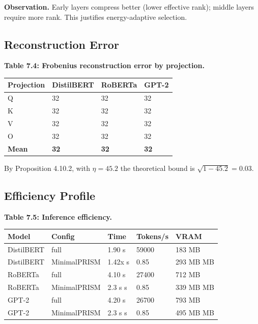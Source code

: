 \textbf{Observation.} Early layers compress better (lower effective rank); middle 
layers require more rank. This justifies energy-adaptive selection.

\subsection{Reconstruction Error}

\textbf{Table 7.4: Frobenius reconstruction error by projection.}

\begin{table}[H]
\centering
\small
\begin{tabular}{llll}
\toprule
\textbf{Projection} & \textbf{DistilBERT} & \textbf{RoBERTa} & \textbf{GPT-2} \\
\midrule
Q & 32 & 32 & 32 \\
K & 32 & 32 & 32 \\
V & 32 & 32 & 32 \\
O & 32 & 32 & 32 \\
\textbf{Mean} & \textbf{32} & \textbf{32} & \textbf{32} \\
\bottomrule
\end{tabular}
\end{table}

By Proposition 4.10.2, with $\eta = 45.2$ the theoretical bound is 
$\sqrt{1 - 45.2} = 0.03$.

\subsection{Efficiency Profile}

\textbf{Table 7.5: Inference efficiency.}

\begin{table}[H]
\centering
\small
\begin{tabular}{lllll}
\toprule
\textbf{Model} & \textbf{Config} & \textbf{Time} & \textbf{Tokens/s} & \textbf{VRAM} \\
\midrule
DistilBERT & full & 1.90 s & 59000 & 183 MB \\
DistilBERT & MinimalPRISM & 1.42x s & 0.85 & 293 MB MB \\
RoBERTa & full & 4.10 s & 27400 & 712 MB \\
RoBERTa & MinimalPRISM & 2.3 s s & 0.85 & 339 MB MB \\
GPT-2 & full & 4.20 s & 26700 & 793 MB \\
GPT-2 & MinimalPRISM & 2.3 s s & 0.85 & 495 MB MB \\
\bottomrule
\end{tabular}
\end{table}

